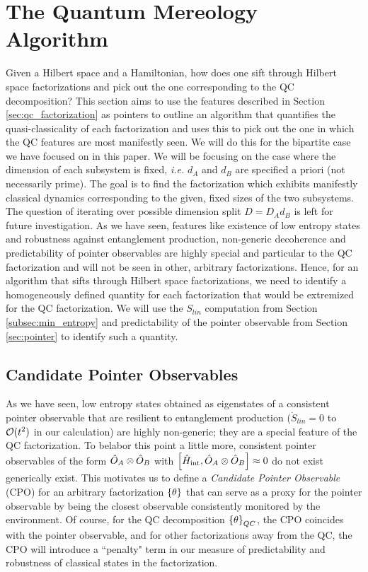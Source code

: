 \documentclass[aps,pra,onecolumn,nofootinbib,12pt,tightenlines]{revtex4-1}
\begin{document}
\section{The Quantum Mereology Algorithm}
\label{sec:algorithm}

Given a Hilbert space and a Hamiltonian, how does one sift through Hilbert space factorizations and pick out the one corresponding to the QC decomposition? This section aims to use the features described in Section \ref{sec:qc_factorization} as pointers to outline an algorithm that quantifies the quasi-classicality of each factorization and uses this to pick out the one in which the QC features are most manifestly seen. We will do this for the bipartite case we have focused on in this paper. {We will be focusing on the case where the dimension of each subsystem is fixed, \textit{i.e.} $d_A$ and $d_B$ are specified a priori (not necessarily prime). The goal is to find the factorization which exhibits manifestly classical dynamics corresponding to the given, fixed sizes of the two subsystems. The question of iterating over possible dimension split $D = D_{A}d_{B}$ is left for future investigation.} As we have seen, features like existence of low entropy states and robustness against entanglement production, non-generic decoherence and predictability of pointer observables are highly special and particular to the QC factorization and will not be seen in other, arbitrary factorizations. Hence, for an algorithm that sifts through Hilbert space factorizations, we need to identify a homogeneously defined quantity for each factorization that would be extremized for the QC factorization. We will use the $S_{lin}$ computation from Section \ref{subsec:min_entropy} and predictability of the pointer observable from Section \ref{sec:pointer} to identify such a quantity. 

\subsection{Candidate Pointer Observables}

As we have seen, low entropy states obtained as eigenstates of a consistent pointer observable that are resilient to entanglement production ($\ddot{S}_{lin} = 0$ to $\mathcal{O}(t^2) $ in our calculation) are highly non-generic; they are a special feature of the QC factorization. To belabor this point a little more, consistent pointer observables of the form $\hat{O}_{A} \otimes \hat{O}_{B}$ with $\left[ \hat{H}_{\rm{int}}, \hat{O}_{A} \otimes \hat{O}_{B} \right] \approx 0$ do not exist generically exist. This motivates us to define a \emph{Candidate Pointer Observable} (CPO) for an arbitrary factorization ${\{\theta\}}$ that can serve as a proxy for the pointer observable by being the closest observable consistently monitored by the environment. Of course, for the QC decomposition ${\{\theta\}}_{QC}$, the CPO coincides with the pointer observable, and for other factorizations away from the QC, the CPO will introduce a ``penalty" term in our measure of predictability and robustness of classical states in the factorization.
\end{document}
